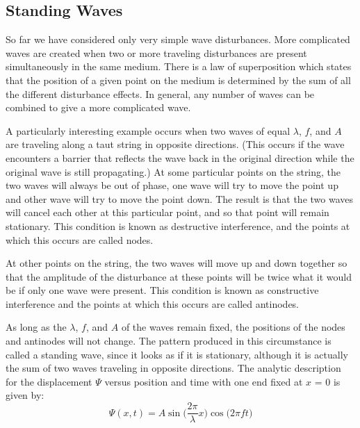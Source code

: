 \subsection{Standing Waves}

So far we have considered only very simple wave disturbances. More complicated waves are created when two or more traveling disturbances are present simultaneously in the same medium. There is a law of superposition which states that the position of a given point on the medium is determined by the sum of all the different disturbance effects. In general, any number of waves can be combined to give a more complicated wave.\myskip

A particularly interesting example occurs when two waves of equal $\lambda$, $f$, and $A$ are traveling along a taut string in opposite directions. (This occurs if the wave encounters a barrier that reflects the wave back in the original direction while the original wave is still propagating.) At some particular points on the string, the two waves will always be out of phase, one wave will try to move the point up and other wave will try to move the point down. The result is that the two waves will cancel each other at this particular point, and so that point will remain stationary. This condition is known as destructive interference, and the points at which this occurs are called nodes. \myskip

At other points on the string, the two waves will move up and down together so that the amplitude of the disturbance at these points will be twice what it would be if only one wave were present. This condition is known as constructive interference and the points at which this occurs are called antinodes. \myskip

As long as the $\lambda$, $f$, and $A$ of the waves remain fixed, the positions of the nodes and antinodes will not change. The pattern produced in this circumstance is called a standing wave, since it looks as if it is stationary, although it is actually the sum of two waves traveling in opposite directions. The analytic description for the displacement $\Psi$ versus position and time with one end fixed at $x$ = 0 is given by: 
\begin{equation}
\Psi (x,t) =  A\sin\bigg(\frac{2\pi}{\lambda}x\bigg)\cos\bigg(2\pi f t\bigg)
\end{equation}

